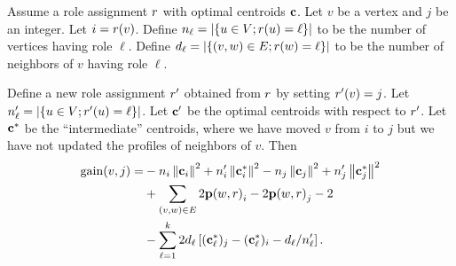 \begin{proposition}
\label{prop:fastgain}
Assume a role assignment $r$ with optimal centroids $\mathbf{c}$.
Let $v$ be a vertex and $j$ be an integer.
Let $i = r(v)$.
Define $n_\ell = {\left|\left\{u \in V ; r(u) = \ell\right\}\right|}$ to be the number of vertices having role $\ell$.
Define $d_\ell = {\left|\left\{(v, w) \in E ; r(w) = \ell\right\}\right|}$ to be the number of neighbors of $v$ having role $\ell$.

Define a new role assignment $r'$ obtained from $r$ by setting $r'(v) = j$.
Let $n'_\ell = {\left|\left\{u \in V ; r'(u) = \ell\right\}\right|}$.
Let $\mathbf{c}'$ be the optimal centroids with respect to $r'$.
Let $\mathbf{c}^*$ be the ``intermediate'' centroids, where we have moved $v$ from $i$ to $j$ but we have not
updated the profiles of neighbors of $v$.  Then
\[
\begin{split}
    \gain{v, j} = 
    & - n_i\norm{\centroid_i}^2 + n_i'\norm{\centroid_i^*}^2 - n_j\norm{\centroid_j}^2 + n_j'\norm{\centroid_j^*}^2 \\
    & + \sum_{(v, w) \in E} 2\prof{w, \role}_i - 2\prof{w, \role}_j  - 2  \\
    & - \sum_{\ell = 1}^k 2d_\ell \spr{(\centroid_\ell^*)_j  - (\centroid_\ell^*)_i - d_\ell / n_\ell' }.  \\
\end{split}
\]
\end{proposition}

